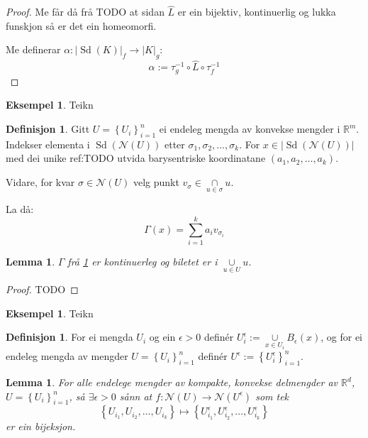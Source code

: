 \documentclass[a4paper, titlepage, 12pt, norsk]{article}
\theoremstyle{plain}
\newtheorem{lemma}[theorem]{Lemma}
\theoremstyle{definition}
\newtheorem{definition}[theorem]{Definisjon}
\newtheorem{example}[theorem]{Eksempel}
\newcommand{\Rb}{\mathbb{R}}
\newcommand{\Nc}{\mathcal{N}}
\newcommand{\intersect}{ \mathop{\cap}\limits } %
\newcommand{\union}{ \mathop{\cup}\limits }
\newcommand{\gr}[1]{ \lvert #1 \rvert } %
\newcommand{\set}[1]{ \left \{ #1 \right \} } %
\DeclareMathOperator{\Sd}{Sd}
\begin{document}
\begin{theroem}
\begin{proof}
	Me får då frå TODO at sidan \( \hat{L} \) er ein bijektiv, kontinuerlig og lukka funskjon så er det ein homeomorfi.

	Me definerar \( \alpha: \gr{\Sd(K)}_f \to \gr{K}_g \):
	\[
		\alpha := \tau_g^{-1} \circ \hat{L} \circ \tau_f^{-1}
	\]
\end{proof}

\begin{example}
	Teikn
\end{example}

\begin{definition} \label{thm:Gamma} %
	Gitt \( U = \set{U_i}_{i=1}^n \) ei endeleg mengda av konvekse mengder i \( \Rb^m \). Indekser elementa i \( \Sd(\Nc(U)) \) etter \( \sigma_1, \sigma_2, \dots, \sigma_k \). For \( x \in \gr{\Sd(\Nc(U))} \)  med dei unike ref:TODO utvida barysentriske koordinatane \( (a_1, a_2, \dots, a_k) \).
	
	Vidare, for kvar \( \sigma \in \Nc(U) \) velg punkt \( v_\sigma \in \intersect_{u \in \sigma} u \). 

	La då:
	\[
		\Gamma(x) = \sum_{i=1}^k a_iv_{\sigma_i}
	\]
\end{definition}

\begin{lemma} %
	\( \Gamma \) frå \ref{thm:Gamma} er kontinuerleg og biletet er i \( \union_{u\in U} u \).
\end{lemma}

\begin{proof}
	TODO
\end{proof}

\begin{example}
	Teikn
\end{example}

\begin{definition} %
	For ei mengda \( U_i \) og ein \( \epsilon > 0 \) definér \( U_i^\epsilon := \union_{x \in U_i} B_\epsilon(x) \), og for ei endeleg mengda av mengder \( U=\set{U_i}_{i=1}^n \) definér \( U^\epsilon := \set{U_i^\epsilon}_{i=1}^n \).
\end{definition}

\begin{lemma} \label{thm:epsilondekke} %
	For alle endelege mengder av kompakte, konvekse delmengder av \( \Rb^d \), \( U = \set{U_i}_{i=1}^n \), så \( \exists \epsilon > 0 \) sånn at \(f: \Nc(U) \to \Nc(U^\epsilon) \) som tek 
	\[ 
		\set{U_{i_1}, U_{i_2}, \dots, U_{i_k}} \mapsto \set{U_{i_1}^\epsilon, U_{i_2}^\epsilon, \dots, U_{i_k}^\epsilon} 
	\] 
	er ein bijeksjon.
\end{lemma}


\end{theroem}
\end{document}
